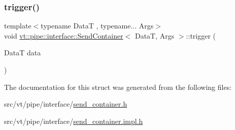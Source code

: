 \subsubsection{\texorpdfstring{trigger()}{trigger()}}
{\footnotesize\ttfamily template$<$typename DataT , typename... Args$>$ \\
void \hyperlink{structvt_1_1pipe_1_1interface_1_1_send_container}{vt\+::pipe\+::interface\+::\+Send\+Container}$<$ DataT, Args $>$\+::trigger (\begin{DoxyParamCaption}\item[{DataT}]{data }\end{DoxyParamCaption})}



The documentation for this struct was generated from the following files\+:\begin{DoxyCompactItemize}
\item 
src/vt/pipe/interface/\hyperlink{send__container_8h}{send\+\_\+container.\+h}\item 
src/vt/pipe/interface/\hyperlink{send__container_8impl_8h}{send\+\_\+container.\+impl.\+h}\end{DoxyCompactItemize}
